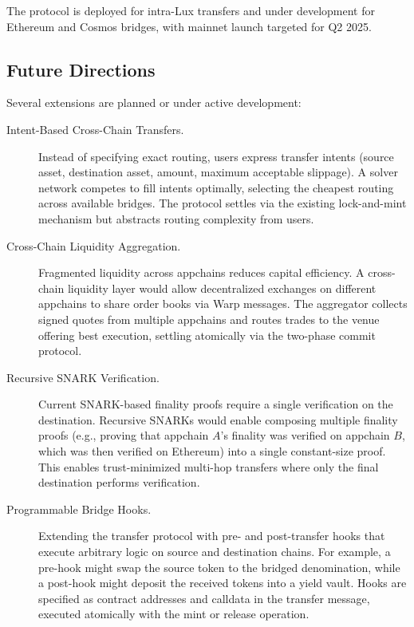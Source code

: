 \documentclass[11pt,a4paper]{article}
\begin{document}
The protocol is deployed for intra-Lux transfers and under development for Ethereum and Cosmos bridges, with mainnet launch targeted for Q2 2025.

\subsection{Future Directions}

Several extensions are planned or under active development:

\begin{description}
    \item[Intent-Based Cross-Chain Transfers.] Instead of specifying exact routing, users express transfer intents (source asset, destination asset, amount, maximum acceptable slippage). A solver network competes to fill intents optimally, selecting the cheapest routing across available bridges. The protocol settles via the existing lock-and-mint mechanism but abstracts routing complexity from users.

    \item[Cross-Chain Liquidity Aggregation.] Fragmented liquidity across appchains reduces capital efficiency. A cross-chain liquidity layer would allow decentralized exchanges on different appchains to share order books via Warp messages. The aggregator collects signed quotes from multiple appchains and routes trades to the venue offering best execution, settling atomically via the two-phase commit protocol.

    \item[Recursive SNARK Verification.] Current SNARK-based finality proofs require a single verification on the destination. Recursive SNARKs would enable composing multiple finality proofs (e.g., proving that appchain $A$'s finality was verified on appchain $B$, which was then verified on Ethereum) into a single constant-size proof. This enables trust-minimized multi-hop transfers where only the final destination performs verification.

    \item[Programmable Bridge Hooks.] Extending the transfer protocol with pre- and post-transfer hooks that execute arbitrary logic on source and destination chains. For example, a pre-hook might swap the source token to the bridged denomination, while a post-hook might deposit the received tokens into a yield vault. Hooks are specified as contract addresses and calldata in the transfer message, executed atomically with the mint or release operation.
\end{description}
\end{document}
